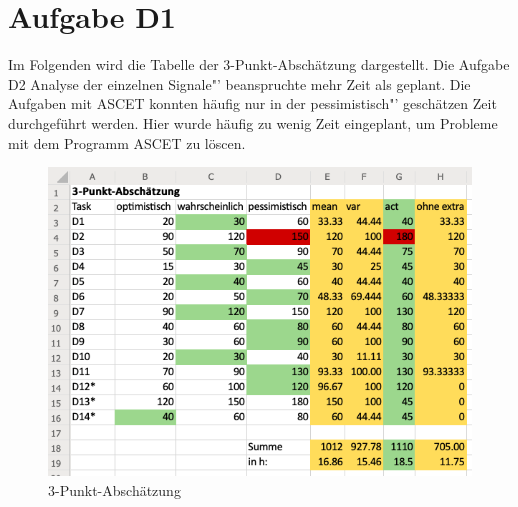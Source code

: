 \chapter{Aufgabe D1}
Im Folgenden wird die Tabelle der 3-Punkt-Abschätzung dargestellt. Die Aufgabe D2 \glqq Analyse der einzelnen Signale"' beanspruchte mehr Zeit als geplant. Die Aufgaben mit ASCET konnten häufig nur in der \glqq pessimistisch"' geschätzen Zeit durchgeführt werden. Hier wurde häufig zu wenig Zeit eingeplant, um Probleme mit dem Programm ASCET zu löscen.\\

\begin{figure}[h!]
	\centering
	\includegraphics[width=1\linewidth]{../Graphiken/Schaetzung.png}
	\caption{3-Punkt-Abschätzung}
	\label{fig:schaetzung}
\end{figure}